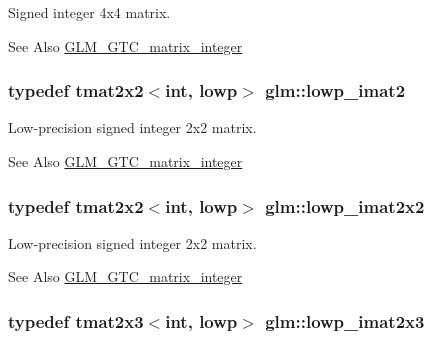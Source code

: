 Signed integer 4x4 matrix. \begin{DoxySeeAlso}{See Also}
\hyperlink{group__gtc__matrix__integer}{G\-L\-M\-\_\-\-G\-T\-C\-\_\-matrix\-\_\-integer} 
\end{DoxySeeAlso}
\hypertarget{group__gtc__matrix__integer_ga4840a4d8b9e8997f1173da9e8e5e4de4}{
\subsubsection[{lowp\-\_\-imat2}]{\setlength{\rightskip}{0pt plus 5cm}typedef tmat2x2$<$int, lowp$>$ {\bf glm\-::lowp\-\_\-imat2}}}\label{group__gtc__matrix__integer_ga4840a4d8b9e8997f1173da9e8e5e4de4}
Low-\/precision signed integer 2x2 matrix. \begin{DoxySeeAlso}{See Also}
\hyperlink{group__gtc__matrix__integer}{G\-L\-M\-\_\-\-G\-T\-C\-\_\-matrix\-\_\-integer} 
\end{DoxySeeAlso}
\hypertarget{group__gtc__matrix__integer_gad1950bd75bc033e8511cec3deb15af56}{
\subsubsection[{lowp\-\_\-imat2x2}]{\setlength{\rightskip}{0pt plus 5cm}typedef tmat2x2$<$int, lowp$>$ {\bf glm\-::lowp\-\_\-imat2x2}}}\label{group__gtc__matrix__integer_gad1950bd75bc033e8511cec3deb15af56}
Low-\/precision signed integer 2x2 matrix. \begin{DoxySeeAlso}{See Also}
\hyperlink{group__gtc__matrix__integer}{G\-L\-M\-\_\-\-G\-T\-C\-\_\-matrix\-\_\-integer} 
\end{DoxySeeAlso}
\hypertarget{group__gtc__matrix__integer_ga00e00501dd9bf929e1dca7a167ba526b}{
\subsubsection[{lowp\-\_\-imat2x3}]{\setlength{\rightskip}{0pt plus 5cm}typedef tmat2x3$<$int, lowp$>$ {\bf glm\-::lowp\-\_\-imat2x3}}}\label{group__gtc__matrix__integer_ga00e00501dd9bf929e1dca7a167ba526b}
